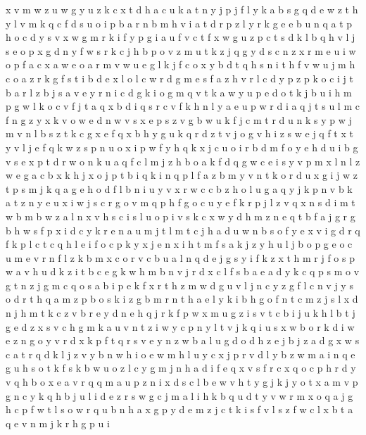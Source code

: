 \documentclass{article}
\begin{document}
x v m w z u
w g y u z k c x t d h a
c u k a t n y j
p j f l y k a b s g q d
e w z t h y l v m k q c f d s u o i p b a r n
b m h v i a t d r
p z l y r k g e
e b u n q a t p h o c d y s v x w g m r k i f
y p g i a u f v c t
f x w g u z p c t s d k l b q h v
l j s e o p
x g d n y f w s r k c j h b p o v z m u t
k z j
q g y d s c n z x r m e u i w o p f a
c x a w e o
a r m v w u e g l k j f c o x y b d t q h s n i
t h
f
v w u j m h c o a z r k g f s t i b d e x l
o l c w r d g m e s f a z
h v r l c d y p
z p k o c i j t b a r
l z b j s a v e y r n i c d g k
i o g m q v t k a w y u p e
d o t k j b u i h m p g w
l k o c v f j t a q x
b d i q s r c v f k h n l y a e u p w
r d i a q j t s u l m c f n g z y x k v o w e
d n w v s
x e p s z v g b w u k f j c m t r
d u n k s y p
w j m v n l b s z t k c g x e f q
x b h y g u k q r d z t v j
o g v h i z s w e j q f t x
t y v l j e f q k w z s p n u o x i
p w f y h q k x j c u o i r b d
m f o y e h d u
i b g v s e x p t d r w o n k u a q f c l m j z h
b o a k f d q g w c e i s y v p m x l n
l z w e g a c b x k h j
x o j p t b i q
k i n
q p l f a z b m y v n t k o r d u x g i j w
z t p s m j k q a g e h o d f l b n i u y v x r w c
c b z h o l u g a q y
j k p n v
b k a t z n y e u x i w j s c r g o v m q p h f
g o c u y e f k r p j l z v q x n s d i m t w b
m b w z a l n x v h s c i
s
l u o p i v s k c x w y d h m z n e q t b f a j g r
g b h w s f p x i d c y k r e n a u m j t
l m t c j h a d u w n b s o f y e x v i
g d r q f k p l c t
c q h l e i
f o c
p k y x
j e
n x i h t m f s a k j
z y h u l j b o p
g e o
c u m e v
r n f l z k b m x c
o r v c b u a l n q d e j g s y i f k z x t h
m r j f o s p w a v h u d k z i t b c e g
k w h m b n v j r d x c l
f s b a e
a d y k c q p s m o v g t n z
j g m c
q o s a b i p e k f x r t h z m w d g u v l j n c y
z
g f l c n v j y s o d r t h q a m z p b
o s k i z g b m r n t h a e l
y k i b h g o f n t c m z j s l x d
n j h
m t k c z v b r e
y d n e h q j r k f p w x m u g z i s v t c
b i j
u k h l b t j g e d z x s v c
h g m k a u v n t z i w y
c p n y l t v j k q i u s x w b o r
k d i w e z n g o y v
r d x
k p f t q r s v e y n z w b a l u g d o
d h z e j b
j z a d g x w s c
a t r q d k l j z v y b n w h i o
e w m h l u y
c x j p r v d l y b z w m a i n q e g u h s o t k f
s k b w u o z l c y g m j n h a d i f e q x v
s f r c x
q o c p h r
d y v
q
h b o x e a v r q
q m a u p z n i x d s c l b e w v h t y g j
k j y
o t x a m v p g n c y k q h b j u l i d e z r s w
g c j m a l i h k b q u d t y v w r
m x o q a j g h c p f w t l s
o w r q u b n h a x g p y d e m z j c t k i s f v l
s z f w c l x b t a q e v n m j k r h g p u i
\end{document}
